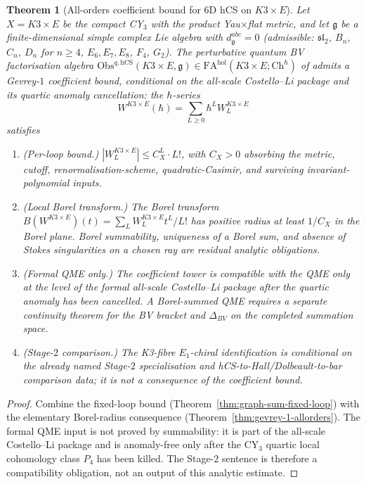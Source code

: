 \documentclass[11pt]{article}
\providecommand{\frakg}{\mathfrak{g}}
\providecommand{\hCS}{\mathrm{hCS}}
\providecommand{\Obs}{\mathrm{Obs}}
\providecommand{\hol}{\mathrm{hol}}
\newtheorem{theorem}{Theorem}
\theoremstyle{definition}\newtheorem{definition}[theorem]{Definition}
\theoremstyle{remark}\newtheorem{remark}[theorem]{Remark}\newtheorem{example}[theorem]{Example}
\begin{document}
\begin{theorem}[All-orders coefficient bound for $6$D hCS on $K3\times E$]
\label{thm:main-allorders-convergence}
Let $X = K3\times E$ be the compact CY$_3$ with the product Yau$\times$flat
metric, and let $\frakg$ be a finite-dimensional simple complex Lie algebra
with $d^{abc}_\frakg = 0$ (admissible: $\mathfrak{sl}_2$, $B_n$, $C_n$,
$D_n$ for $n\geq 4$, $E_6, E_7, E_8$, $F_4$, $G_2$). The perturbative
quantum BV factorisation algebra
$\Obs^{q,\hCS}(K3\times E,\frakg)\in\mathrm{FA}^{\hol}(K3\times E;
\mathrm{Ch}^{\hbar})$ of \cite[theorem on the $6$d hCS factorisation algebra on $K3\times E$]{cy_to_chiral}
admits a Gevrey-$1$ coefficient bound, conditional on the all-scale
Costello--Li package and its quartic anomaly cancellation: the
$\hbar$-series
\begin{equation}
\label{eq:final-allorders-series}
W^{K3\times E}(\hbar) = \sum_{L\geq 0}\hbar^L W_L^{K3\times E}
\end{equation}
satisfies
\begin{enumerate}[label=\textup{(\arabic*)}]
\item \textup{(Per-loop bound.)}
$|W_L^{K3\times E}|\leq C_X^L\cdot L!$, with
$C_X>0$ absorbing the metric, cutoff, renormalisation-scheme,
quadratic-Casimir, and surviving invariant-polynomial inputs.
\item \textup{(Local Borel transform.)} The Borel transform
$B(W^{K3\times E})(t) = \sum_L W_L^{K3\times E} t^L/L!$ has positive
radius at least $1/C_X$ in the Borel plane. Borel summability,
uniqueness of a Borel sum, and absence of Stokes singularities on a
chosen ray are residual analytic obligations.
\item \textup{(Formal QME only.)} The coefficient tower is compatible
with the QME only at the level of the formal all-scale Costello--Li
package after the quartic anomaly has been cancelled. A Borel-summed
QME requires a separate continuity theorem for the BV bracket and
$\Delta_{BV}$ on the completed summation space.
\item \textup{(Stage-$2$ comparison.)} The K3-fibre $E_1$-chiral
identification is conditional on the already named Stage-$2$
specialisation and hCS-to-Hall/Dolbeault-to-bar comparison data; it is
not a consequence of the coefficient bound.
\end{enumerate}
\end{theorem}

\begin{proof}
Combine the fixed-loop bound (Theorem~\ref{thm:graph-sum-fixed-loop})
with the elementary Borel-radius consequence
(Theorem~\ref{thm:gevrey-1-allorders}). The formal QME input is not
proved by summability: it is part of the all-scale Costello--Li package
and is anomaly-free only after the CY$_3$ quartic local cohomology
class $P_4$ has been killed. The Stage-$2$ sentence is therefore a
compatibility obligation, not an output of this analytic estimate.
\end{proof}
\end{document}
